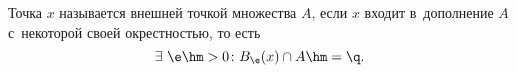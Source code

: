
    Точка $x$ называется внешней точкой множества $A$, если $x$ входит в~дополнение $A$ с~некоторой своей окрестностью, то есть
    \[ \exists\  \e\hm>0\colon B_\e(x)\cap A\hm=\q.\]
